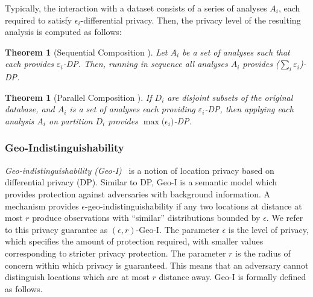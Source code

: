 \documentclass{USC-Thesis}
\numberwithin{equation}{chapter}
\begin{document}
Typically, the interaction with a dataset consists of a series of analyses $A_i$, each required to satisfy $\epsilon_i$-differential privacy. Then, the privacy level of the resulting analysis is computed as follows:
\newtheorem{sequential_composition}[theorem]{Theorem}\label{sequential_composition}
\begin{sequential_composition} [Sequential Composition \cite{mcsherry2009differentially}]
Let $A_i$ be a set of analyses such that each provides $\varepsilon_i$-DP. Then, running in sequence all analyses $A_i$ provides ($\sum_{i}\varepsilon_i$)-DP.
\end{sequential_composition}
\newtheorem{parallel_composition}[theorem]{Theorem}\label{parallel_composition}
\begin{parallel_composition} [Parallel Composition \cite{mcsherry2009differentially}]
If $D_i$ are disjoint subsets of the original database, and $A_i$ is a set of analyses each providing $\varepsilon_i$-DP, then applying each analysis $A_i$ on partition $D_i$ provides $\max{(\epsilon_i})$-DP.
\end{parallel_composition}

\subsubsection{Geo-Indistinguishability}\label{sec:geo-i}
{\em Geo-indistinguishability (Geo-I)}~\cite{andres2013geo} is a notion of location privacy based on differential privacy (DP). Similar to DP, Geo-I is a semantic model which provides protection against adversaries with background information.
A mechanism provides $\epsilon$-geo-indistinguishability if any two locations at distance at most $r$ produce observations with ``similar'' distributions bounded by $\epsilon$. We refer to this privacy guarantee as $(\epsilon,r)$-Geo-I. The parameter $\epsilon$ is the level of privacy, which specifies the amount of protection required, with smaller values corresponding to stricter privacy protection. The parameter $r$ is the radius of concern within which privacy is guaranteed. This means that an adversary cannot distinguish locations which are at most $r$ distance away. Geo-I is formally defined as follows.

\end{document}

